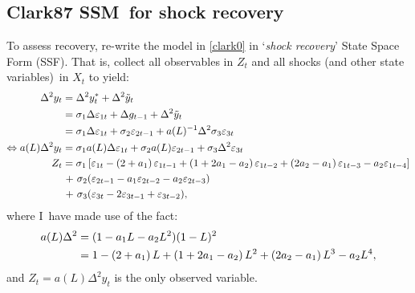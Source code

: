 \documentclass[a4paper,12pt]{article}
\begin{document}
\subsection{Clark87 SSM\ for shock recovery}

To assess recovery, re-write the model in \ref{clark0} in `\emph{shock
recovery}' State Space Form (SSF). That is, collect all observables in $%
Z_{t} $ and all shocks (and other state variables)\ in $X_{t}$ to yield:%
\begin{align}
\Delta ^{2}y_{t}& =\Delta ^{2}y_{t}^{\ast }+\Delta ^{2}\tilde{y}_{t}  \notag
\label{Z} \\
& =\sigma _{1}\Delta \varepsilon _{1t}+\Delta g_{t-1}+\Delta ^{2}\tilde{y}%
_{t}  \notag \\
& =\sigma _{1}\Delta \varepsilon _{1t}+\sigma _{2}\varepsilon
_{2t-1}+a(L)^{-1}\Delta ^{2}\sigma _{3}\varepsilon _{3t}  \notag \\
\Leftrightarrow a(L)\Delta ^{2}y_{t}& =\sigma _{1}a(L)\Delta \varepsilon
_{1t}+\sigma _{2}a(L)\varepsilon _{2t-1}+\sigma _{3}\Delta ^{2}\varepsilon
_{3t}  \notag \\
Z_{t}& =\sigma _{1}\left[ \varepsilon _{1t}-\left( 2+a_{1}\right)
\varepsilon _{1t-1}+\left( 1+2a_{1}-a_{2}\right) \varepsilon _{1t-2}+\left(
2a_{2}-a_{1}\right) \varepsilon _{1t-3}-a_{2}\varepsilon _{1t-4}\right] 
\notag \\
& \hspace{1pt}+\hspace{1pt}\sigma _{2}(\varepsilon _{2t-1}-a_{1}\varepsilon
_{2t-2}-a_{2}\varepsilon _{2t-3}) \\
& \hspace{1pt}+\hspace{1pt}\sigma _{3}(\varepsilon _{3t}-2\varepsilon
_{3t-1}+\varepsilon _{3t-2}),  \notag
\end{align}%
where I\ have made use of the fact: 
\begin{align}
a(L)\Delta ^{2}& =(1-a_{1}L-a_{2}L^{2})(1-L)^{2}  \notag \\
& =1-\left( 2+a_{1}\right) L+\left( 1+2a_{1}-a_{2}\right) L^{2}+\left(
2a_{2}-a_{1}\right) L^{3}-a_{2}L^{4},  \label{expaL}
\end{align}%
and $Z_{t}=a(L)\Delta ^{2}y_{t}$ is the only observed variable.
\end{document}
